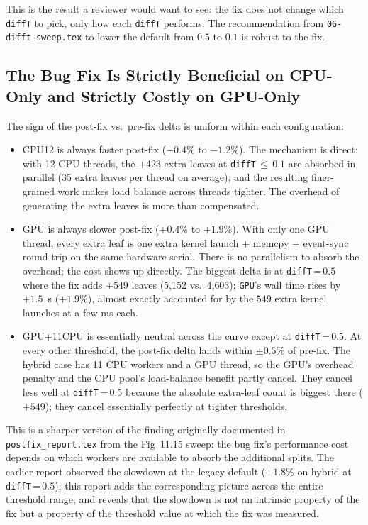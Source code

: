 \documentclass[
	english,
	letterpaper, oneside
]{article}
\begin{document}
\noindent
This is the result a reviewer would want to see: the fix does not
change which \texttt{diffT} to pick, only how each \texttt{diffT}
performs. The recommendation from \texttt{06-difft-sweep.tex} to lower
the default from $0.5$ to $0.1$ is robust to the fix.

\subsection{The Bug Fix Is Strictly Beneficial on CPU-Only and Strictly Costly on GPU-Only}

The sign of the post-fix vs.\ pre-fix delta is uniform within each
configuration:

\begin{itemize}
    \item CPU12 is always faster post-fix ($-0.4\%$ to
    $-1.2\%$). The mechanism is direct: with 12 CPU threads, the +423
    extra leaves at \texttt{diffT}\,$\le$\,$0.1$ are absorbed in
    parallel (35 extra leaves per thread on average), and the resulting
    finer-grained work makes load balance across threads tighter. The
    overhead of generating the extra leaves is more than compensated.
    \item GPU is always slower post-fix ($+0.4\%$ to
    $+1.9\%$). With only one GPU thread, every extra leaf is one extra
    kernel launch + memcpy + event-sync round-trip on the same hardware
    serial. There is no parallelism to absorb the overhead; the cost
    shows up directly. The biggest delta is at \texttt{diffT}\,=\,$0.5$
    where the fix adds $+549$ leaves (5{,}152 vs.\ 4{,}603);
    \texttt{GPU}'s wall time rises by $+1.5$~s ($+1.9\%$), almost
    exactly accounted for by the $549$ extra kernel launches at a few
    ms each.
    \item GPU+11CPU is essentially neutral across the curve
    except at \texttt{diffT}\,=\,$0.5$. At every other threshold, the
    post-fix delta lands within $\pm 0.5\%$ of pre-fix. The hybrid
    case has 11 CPU workers and a GPU thread, so the GPU's
    overhead penalty and the CPU pool's load-balance benefit partly
    cancel. They cancel less well at \texttt{diffT}\,=\,$0.5$ because
    the absolute extra-leaf count is biggest there ($+549$); they
    cancel essentially perfectly at tighter thresholds.
\end{itemize}

\noindent
This is a sharper version of the finding originally documented in
\texttt{postfix\_report.tex} from the Fig~11.15 sweep: the bug fix's
performance cost depends on which workers are available to absorb the
additional splits. The earlier report observed the slowdown at the
legacy default ($+1.8\%$ on hybrid at \texttt{diffT}\,=\,$0.5$); this
report adds the corresponding picture across the entire threshold
range, and reveals that the slowdown is not an intrinsic property of
the fix but a property of the threshold value at which the fix was
measured.
\end{document}
